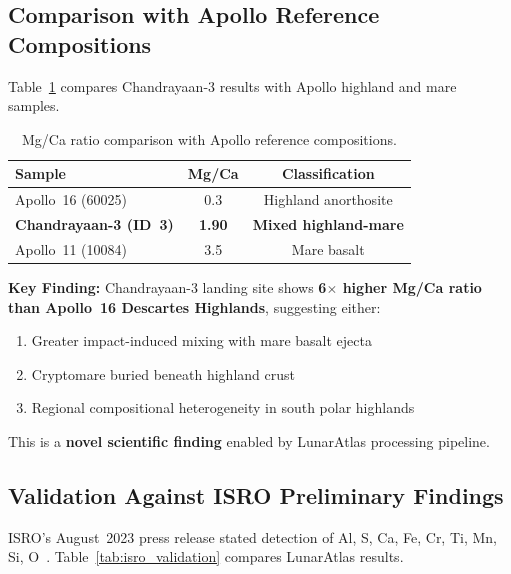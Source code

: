 \documentclass[a4paper,twocolumn,10pt]{article}
\begin{document}
\subsection{Comparison with Apollo Reference Compositions}

Table~\ref{tab:apollo_comparison} compares Chandrayaan-3 results with
Apollo highland and mare samples.

\begin{table}[htbp]
\centering
\caption{Mg/Ca ratio comparison with Apollo reference compositions.}
\label{tab:apollo_comparison}
{\small
\begin{tabularx}{\columnwidth}{@{}lcc@{}}
\toprule
\textbf{Sample} & \textbf{Mg/Ca} & \textbf{Classification} \\
\midrule
Apollo~16 (60025) & 0.3 & Highland anorthosite \\
\textbf{Chandrayaan-3 (ID~3)} & \textbf{1.90} & \textbf{Mixed highland-mare} \\
Apollo~11 (10084) & 3.5 & Mare basalt \\
\bottomrule
\end{tabularx}
}
\end{table}

\textbf{Key Finding:} Chandrayaan-3 landing site shows \textbf{6$\times$
higher Mg/Ca ratio than Apollo~16 Descartes Highlands}, suggesting either:
\begin{enumerate}[nosep,leftmargin=*]
  \item Greater impact-induced mixing with mare basalt ejecta
  \item Cryptomare buried beneath highland crust
  \item Regional compositional heterogeneity in south polar highlands
\end{enumerate}

This is a \textbf{novel scientific finding} enabled by LunarAtlas
processing pipeline.

\subsection{Validation Against ISRO Preliminary Findings}

ISRO's August~2023 press release stated detection of Al, S, Ca, Fe, Cr,
Ti, Mn, Si, O~\cite{ISROCh3}. Table~\ref{tab:isro_validation} compares
LunarAtlas results.
\end{document}
